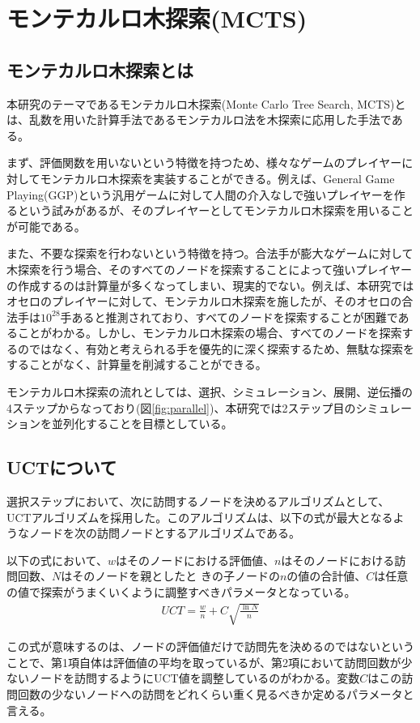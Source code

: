 \documentclass[10pt, a4paper]{jsarticle}
\begin{document}
\section{モンテカルロ木探索(MCTS)}
\subsection{モンテカルロ木探索とは}
本研究のテーマであるモンテカルロ木探索(Monte Carlo Tree Search, MCTS)とは、乱数を用いた計算手法であるモンテカルロ法を木探索に応用した手法である。
\par まず、評価関数を用いないという特徴を持つため、様々なゲームのプレイヤーに対してモンテカルロ木探索を実装することができる。例えば、General Game Playing(GGP)という汎用ゲームに対して人間の介入なしで強いプレイヤーを作るという試みがあるが、そのプレイヤーとしてモンテカルロ木探索を用いることが可能である。
\par また、不要な探索を行わないという特徴を持つ。合法手が膨大なゲームに対して木探索を行う場合、そのすべてのノードを探索することによって強いプレイヤーの作成するのは計算量が多くなってしまい、現実的でない。例えば、本研究ではオセロのプレイヤーに対して、モンテカルロ木探索を施したが、そのオセロの合法手は$10^{28}$手あると推測されており、すべてのノードを探索することが困難であることがわかる。しかし、モンテカルロ木探索の場合、すべてのノードを探索するのではなく、有効と考えられる手を優先的に深く探索するため、無駄な探索をすることがなく、計算量を削減することができる。
\par モンテカルロ木探索の流れとしては、選択、シミュレーション、展開、逆伝播の4ステップからなっており(図\ref{fig:parallel})、本研究では2ステップ目のシミュレーションを並列化することを目標としている。
\subsection{UCTについて}
選択ステップにおいて、次に訪問するノードを決めるアルゴリズムとして、UCTアルゴリズムを採用した。このアルゴリズムは、以下の式が最大となるようなノードを次の訪問ノードとするアルゴリズムである。
\par 以下の式において、$w$はそのノードにおける評価値、$n$はそのノードにおける訪問回数、$N$はそのノードを親としたと きの子ノードの$n$の値の合計値、$C$は任意の値で探索がうまくいくように調整すべきパラメータとなっている。
\begin{eqnarray}
    UCT = \frac{w}{n} + C\sqrt{\frac{\ln{N}}{n}}
\end{eqnarray}
\par
この式が意味するのは、ノードの評価値だけで訪問先を決めるのではないということで、第1項自体は評価値の平均を取っているが、第2項において訪問回数が少ないノードを訪問するようにUCT値を調整しているのがわかる。変数$C$はこの訪問回数の少ないノードへの訪問をどれくらい重く見るべきか定めるパラメータと言える。
\end{document}
